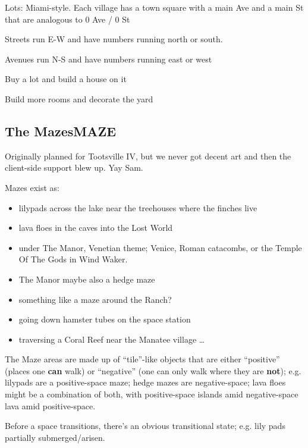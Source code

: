 \documentclass[11pt]{article}
\begin{document}
Lots: Miami-style. Each village has a  town square with a main Ave and
a main St that are analogous to 0 Ave / 0 St

Streets run E-W and have numbers running north or south.

Avenues run N-S and have numbers running east or west

Buy a lot and build a house on it

Build more rooms and decorate the yard
\subsection{The Mazes\hfill{}\textsc{MAZE}}
\label{sec-3-3}

Originally planned for Tootsville IV, but we never got decent art and
then the client-side support blew up. Yay Sam.

Mazes exist as:

\begin{itemize}
\item lilypads across the lake near the treehouses where the finches live

\item lava floes in the caves into the Lost World

\item under The Manor, Venetian theme; Venice, Roman catacombs, or the
Temple Of The Gods in Wind Waker.

\item The Manor maybe also a hedge maze

\item something like a maze around the Ranch?

\item going down hamster tubes on the space station

\item traversing a Coral Reef near the Manatee village \ldots{}
\end{itemize}


The Maze areas are made up of “tile”-like objects that are either
“positive” (places one \textbf{can} walk) or “negative” (one can only walk
where they are \textbf{not}); e.g. lilypads are a positive-space maze; hedge
mazes are negative-space; lava floes might be a combination of both,
with positive-space islands amid negative-space lava amid
positive-space.

Before a space transitions, there's an obvious transitional state;
e.g. lily pads partially submerged/arisen.
\end{document}
